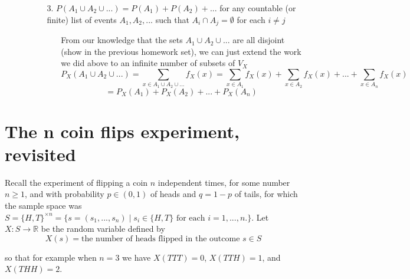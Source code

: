 \documentclass[hidelinks]{article}
\begin{document}
\begin{itemize}
\begin{itemize}
\begin{itemize}
\begin{itemize}
\[                \]
            \end{itemize}
            \item[3.] $P(A_1 \cup A_2 \cup ...) = P(A_1) + P(A_2) + ...$ for any countable (or finite) list of events $A_1, A_2, ...$ such that $A_i \cap A_j= \emptyset$ for each $i \neq j$
            \begin{itemize}
                \item[ ] From our knowledge that the sets $A_1 \cup A_2 \cup ...$ are all disjoint (show in the previous homework set), we can just extend the work we did above to an infinite number of subsets of $V_X$
                \[
                    P_X(A_1 \cup A_2 \cup ... ) =  \sum_{x \in A_1 \cup A_2 \cup ... } f_X(x) =  \sum_{x \in A_1} f_X(x) +  \sum_{x \in A_2} f_X(x) + ... + \sum_{x \in A_n} f_X(x) 
                \]
                \[
                    = P_X(A_1) + P_X(A_2) + ... +P_X(A_n)
                \]
            \end{itemize}
        \end{itemize}
    \end{itemize}
\end{itemize}
\newpage
\section{The n coin flips experiment, revisited}
Recall the experiment of flipping a coin $n$ independent times, for some number $n \geq 1$, and with probability $p \in (0,1)$ of heads and $q = 1 - p$ of tails, for which the sample space was $S = \{H, T\}^{ \times n } = \{s = (s_1, ..., s_n) \mid s_i \in \{H, T\} \text{ for each } i = 1, ..., n. \}$.
Let $X : S \rightarrow \mathbb{R}$ be the random variable defined by
$$X(s) = \text{the number of heads flipped in the outcome } s \in S$$

so that for example when $n = 3$ we have $X(TTT) = 0$, $X(TTH) = 1$, and $X(THH) = 2$.
\end{document}
